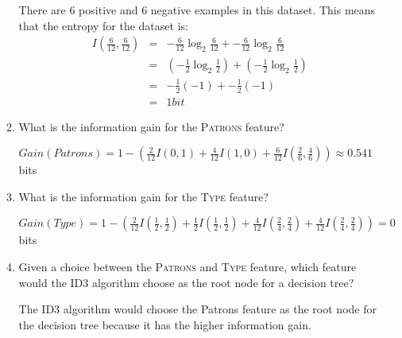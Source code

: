 \documentclass[--SOLUTION-OPTION--]{ditpaper}
\begin{document}
\begin{enumerate}
\begin{enumerate}
			\begin{answer}
					There are 6 positive and 6 negative examples in this dataset. This means that the entropy for the dataset is:
					\begin{eqnarray*}
						I(\frac{6}{12}, \frac{6}{12}) &=& -\frac{6}{12}\log_2\frac{6}{12} + -\frac{6}{12}\log_2 \frac{6}{12}\\
									~ &=& (-\frac{1}{2}\log_2\frac{1}{2}) + (-\frac{1}{2}\log_2\frac{1}{2}) \\ 
						~ &=&  -\frac{1}{2}(-1) + -\frac{1}{2}(-1) \\
						 ~ &=&  1bit
					\end{eqnarray*}			
			\end{answer}
		\item What is the information gain for the \textsc{Patrons} feature?
			\begin{answer}
							$Gain(Patrons)=1- ( \frac{2}{12}I(0,1) + \frac{4}{12}I(1,0) + \frac{6}{12}I(\frac{2}{6},\frac{4}{6}) ) \approx 0.541$ bits
			\end{answer}
		\item What is the information gain for the \textsc{Type} feature?
			\begin{answer}
							$Gain(Type)=1- ( \frac{2}{12}I(\frac{1}{2},\frac{1}{2}) + \frac{1}{2}I(\frac{1}{2},\frac{1}{2}) + \frac{4}{12}I(\frac{2}{4},\frac{2}{4})+ \frac{4}{12}I(\frac{2}{4},\frac{2}{4}) ) = 0$ bits
			\end{answer}
		\item Given a choice between the \textsc{Patrons} and \textsc{Type} feature, which feature would the ID3 algorithm choose as the root node for a decision tree?
			\begin{answer}
					The ID3 algorithm would choose the Patrons feature as the root node for the decision tree because it has the higher information gain.
			\end{answer}
	\end{enumerate}
\end{enumerate}

\newpage 
\end{document}
